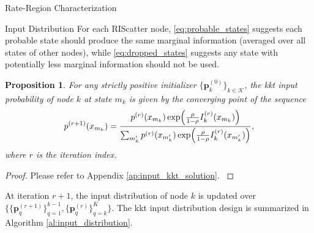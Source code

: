 \documentclass[journal]{IEEEtran}
\newtheorem{proposition}{Proposition}
\begin{document}
\begin{section}{Rate-Region Characterization}
\begin{subsection}{Input Distribution}
		For each RIScatter node, \eqref{eq:probable_states} suggests each probable state should produce the same marginal information (averaged over all states of other nodes), while \eqref{eq:dropped_states} suggests any state with potentially less marginal information should not be used.
		\begin{proposition}
			For any strictly positive initializer $\{\boldsymbol{p}_k^{(0)}\}_{k \in \mathcal{K}}$, the \gls{kkt} input probability of node $k$ at state $m_k$ is given by the converging point of the sequence
			\begin{equation}
				p^{(r+1)}(x_{m_k}) = \frac{p^{(r)}(x_{m_k}) \exp \Bigl( \frac{\rho}{1 - \rho} I_k^{(r)}(x_{m_k}) \Bigr)}{\sum_{m_k'} p^{(r)}(x_{m_k'}) \exp \Bigl( \frac{\rho}{1 - \rho} I_k^{(r)}(x_{m_k'}) \Bigr)},
				\label{eq:input_kkt_solution}
			\end{equation}
			where $r$ is the iteration index.
			\label{pr:input_kkt_solution}
		\end{proposition}
		\begin{proof}
			Please refer to Appendix \ref{ap:input_kkt_solution}.
			\label{pf:input_kkt_solution}
		\end{proof}

		At iteration $r+1$, the input distribution of node $k$ is updated over $\bigl\{\{\boldsymbol{p}_q^{(r+1)}\}_{q=1}^{k-1},\{\boldsymbol{p}_q^{(r)}\}_{q=k}^{K}\bigr\}$.
		The \gls{kkt} input distribution design is summarized in Algorithm \ref{al:input_distribution}.


\end{subsection}
\end{section}
\end{document}
